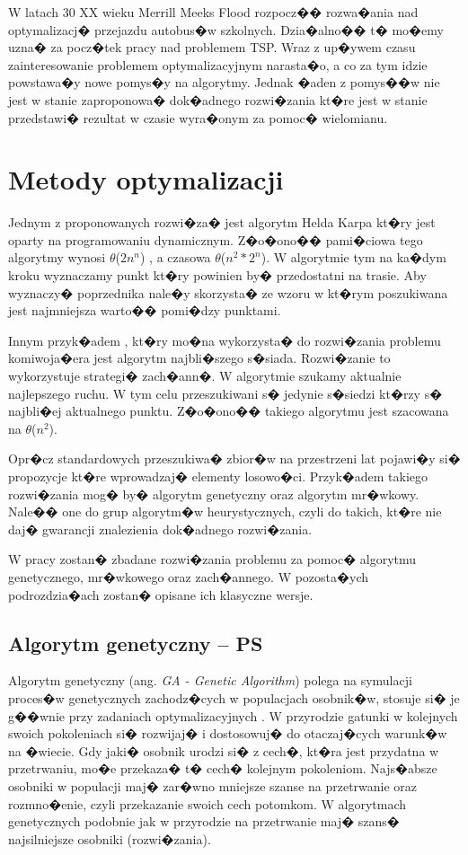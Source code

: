 W latach 30 XX wieku Merrill Meeks Flood rozpocz�� rozwa�ania nad optymalizacj� przejazdu autobus�w szkolnych. Dzia�alno�� t� mo�emy uzna� za pocz�tek pracy nad problemem TSP. Wraz z up�ywem czasu zainteresowanie problemem optymalizacyjnym narasta�o, a co za tym idzie powstawa�y nowe pomys�y na algorytmy. Jednak �aden z pomys��w nie jest w stanie zaproponowa� dok�adnego rozwi�zania kt�re jest w stanie przedstawi� rezultat w czasie wyra�onym za pomoc� wielomianu.

\section{Metody optymalizacji} 
	
Jednym z proponowanych rozwi�za� jest algorytm Helda Karpa kt�ry jest oparty na programowaniu dynamicznym. Z�o�ono�� pami�ciowa tego algorytmy wynosi $\theta$(\(2n^n\))
, a czasowa $\theta$(\(n^2*2^n\)). W algorytmie tym na ka�dym kroku wyznaczamy punkt kt�ry powinien by� przedostatni na trasie. Aby wyznaczy� poprzednika nale�y skorzysta� ze wzoru w kt�rym poszukiwana jest najmniejsza warto�� pomi�dzy punktami.

Innym przyk�adem , kt�ry mo�na wykorzysta� do rozwi�zania problemu komiwoja�era jest algorytm najbli�szego s�siada. Rozwi�zanie to wykorzystuje strategi� zach�ann�. W algorytmie szukamy aktualnie najlepszego ruchu. W tym celu przeszukiwani s� jedynie s�siedzi kt�rzy s� najbli�ej aktualnego punktu. Z�o�ono�� takiego algorytmu jest szacowana na $\theta$(\(n^2\)).

Opr�cz standardowych przeszukiwa� zbior�w na przestrzeni lat pojawi�y si� propozycje kt�re wprowadzaj� elementy losowo�ci. Przyk�adem takiego rozwi�zania mog� by� algorytm genetyczny oraz algorytm mr�wkowy. Nale�� one do grup algorytm�w heurystycznych, czyli do takich, kt�re nie daj� gwarancji znalezienia dok�adnego rozwi�zania.

W pracy zostan� zbadane rozwi�zania problemu za pomoc� algorytmu genetycznego, mr�wkowego oraz zach�annego. W pozosta�ych podrozdzia�ach zostan� opisane ich klasyczne wersje.

\subsection{Algorytm genetyczny -- PS}
Algorytm genetyczny (ang.  \textit{GA - Genetic Algorithm}) polega na symulacji proces�w genetycznych zachodz�cych w populacjach osobnik�w, stosuje si� je g��wnie przy zadaniach optymalizacyjnych \cite{genetic_9}. W przyrodzie  gatunki w kolejnych swoich pokoleniach si� rozwijaj� i dostosowuj� do otaczaj�cych warunk�w na �wiecie. Gdy jaki� osobnik urodzi si� z cech�, kt�ra jest przydatna w przetrwaniu, mo�e przekaza� t� cech� kolejnym pokoleniom. Najs�absze osobniki w populacji maj� zar�wno mniejsze szanse na przetrwanie oraz rozmno�enie, czyli przekazanie swoich cech potomkom. W algorytmach genetycznych podobnie jak w przyrodzie na przetrwanie maj� szans� najsilniejsze osobniki (rozwi�zania).

